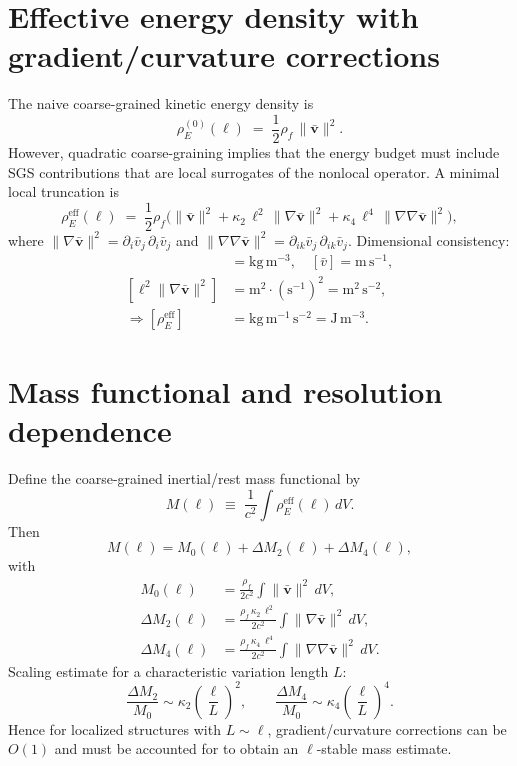 \documentclass[11pt]{article}
\newcommand{\rhoF}{\rho_{\!f}}
\newcommand{\rhoE}{\rho_{\!E}}
\begin{document}
\section{Effective energy density with gradient/curvature corrections}
The naive coarse-grained kinetic energy density is
\begin{equation}
\rhoE^{(0)}(\ell) \;=\; \frac12 \rhoF\,\lVert \bar{\mathbf{v}}\rVert^2.
\end{equation}
However, quadratic coarse-graining implies that the energy budget must include SGS contributions that are local surrogates of the nonlocal operator. A minimal local truncation is
\begin{equation}
\rhoE^{\mathrm{eff}}(\ell)
\;=\;
\frac12 \rhoF\Big(
\lVert \bar{\mathbf{v}} \rVert^2
+\kappa_2\,\ell^2\,\lVert \nabla \bar{\mathbf{v}} \rVert^2
+\kappa_4\,\ell^4\,\lVert \nabla\nabla \bar{\mathbf{v}} \rVert^2
\Big),
\label{eq:rhoE_eff}
\end{equation}
where $\lVert \nabla \bar{\mathbf{v}} \rVert^2 = \partial_i \bar v_j\,\partial_i \bar v_j$ and $\lVert \nabla\nabla \bar{\mathbf{v}} \rVert^2 = \partial_{ik}\bar v_j\,\partial_{ik}\bar v_j$.
Dimensional consistency:
\begin{align}
[\rhoF] &= \mathrm{kg\,m^{-3}}, \quad [\bar v] = \mathrm{m\,s^{-1}},\\
[\ell^2 \lVert \nabla \bar{\mathbf{v}}\rVert^2] &= \mathrm{m^2}\cdot (\mathrm{s^{-1}})^2 = \mathrm{m^2\,s^{-2}},\\
\Rightarrow [\rhoE^{\mathrm{eff}}] &= \mathrm{kg\,m^{-1}\,s^{-2}} = \mathrm{J\,m^{-3}}.
\end{align}

\section{Mass functional and resolution dependence}
Define the coarse-grained inertial/rest mass functional by
\begin{equation}
M(\ell) \;\equiv\; \frac{1}{c^2}\int \rhoE^{\mathrm{eff}}(\ell)\,dV.
\label{eq:M_def}
\end{equation}
Then
\begin{equation}
M(\ell) = M_0(\ell) + \Delta M_2(\ell) + \Delta M_4(\ell),
\end{equation}
with
\begin{align}
M_0(\ell) &= \frac{\rhoF}{2c^2}\int \lVert \bar{\mathbf{v}}\rVert^2\,dV,\\
\Delta M_2(\ell) &= \frac{\rhoF\,\kappa_2\,\ell^2}{2c^2}\int \lVert \nabla \bar{\mathbf{v}} \rVert^2\,dV,\\
\Delta M_4(\ell) &= \frac{\rhoF\,\kappa_4\,\ell^4}{2c^2}\int \lVert \nabla\nabla \bar{\mathbf{v}} \rVert^2\,dV.
\end{align}
Scaling estimate for a characteristic variation length $L$:
\begin{equation}
\frac{\Delta M_2}{M_0}\sim \kappa_2\left(\frac{\ell}{L}\right)^2,
\qquad
\frac{\Delta M_4}{M_0}\sim \kappa_4\left(\frac{\ell}{L}\right)^4.
\end{equation}
Hence for localized structures with $L\sim \ell$, gradient/curvature corrections can be $O(1)$ and must be accounted for to obtain an $\ell$-stable mass estimate.
\end{document}
